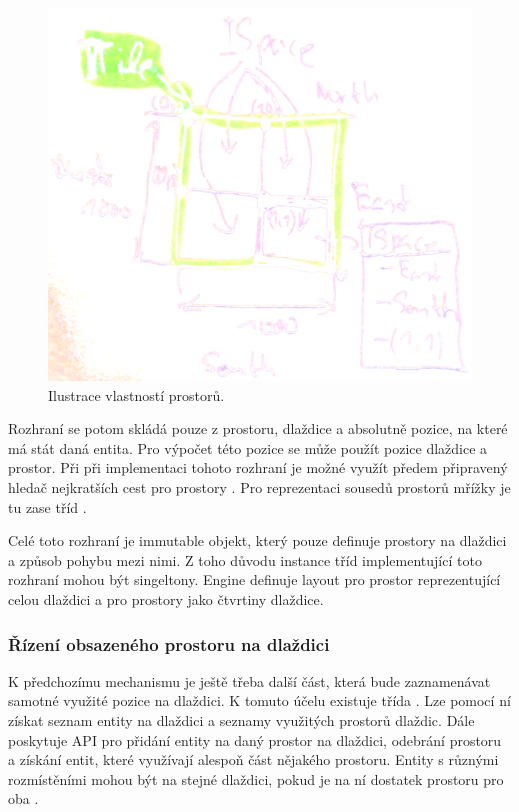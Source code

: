 \begin{figure}[H]\centering
\includegraphics[width=\textwidth]{./img/tile-spaces.png}
\caption{Ilustrace vlastností prostorů. }
\label{tile-spaces}
\end{figure}

Rozhraní  se potom skládá pouze z prostoru, dlaždice a absolutně pozice, na které má stát daná entita.
Pro výpočet této pozice se může použít pozice dlaždice a prostor. Při při implementaci tohoto rozhraní je možné využít 
předem připravený hledač nejkratších cest pro prostory . Pro reprezentaci sousedů prostorů mřížky je tu 
zase tříd .

Celé toto rozhraní je immutable objekt, který pouze definuje prostory na dlaždici a způsob pohybu mezi nimi. Z toho důvodu
instance tříd implementující toto rozhraní mohou být singeltony. Engine definuje layout pro prostor reprezentující celou dlaždici
a pro prostory jako čtvrtiny dlaždice.

\subsubsection{Řízení obsazeného prostoru na dlaždici}

K předchozímu mechanismu je ještě třeba další část, která bude zaznamenávat samotné využité pozice na dlaždici. K tomuto 
účelu existuje třída .  Lze pomocí ní získat seznam entity na dlaždici a seznamy využitých prostorů dlaždic.
Dále poskytuje API pro přidání entity na daný prostor na dlaždici, odebrání prostoru a získání entit, které využívají 
alespoň část nějakého prostoru. Entity s různými rozmístěními mohou být na stejné dlaždici, pokud
je na ní dostatek prostoru pro oba .

